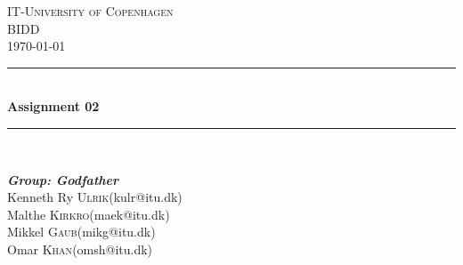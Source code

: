 \begin{titlepage}
\newcommand{\HRule}{\rule{\linewidth}{0.5mm}}

\center

\textsc{\Large IT-University of Copenhagen}\\[1cm]
\textsc{\large BIDD}\\
\textsc{\today}
\HRule\\[0.4cm]
{\huge \bfseries Assignment 02}\\[0.4cm]
\HRule\\[1.5cm]

\begin{minipage}{0.7\textwidth}
\begin{flushleft} \Large
\emph{\textbf{Group: Godfather}}\\
\large
Kenneth Ry \textsc{Ulrik}(kulr@itu.dk)\\
Malthe \textsc{Kirkro}(maek@itu.dk)\\
Mikkel \textsc{Gaub}(mikg@itu.dk)\\
Omar \textsc{Khan}(omsh@itu.dk)\\
\end{flushleft}
\end{minipage}


\end{titlepage}